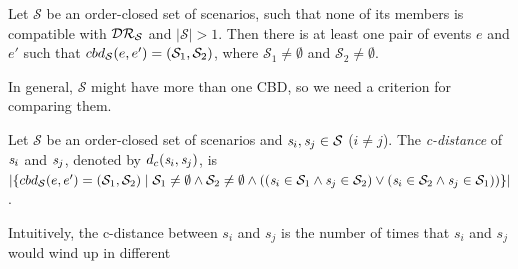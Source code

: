 \begin{theorem}
\label{thm-not-locally-stable}
Let $\mathcal{S}$ be an order-closed set of scenarios, such that
none of its members is compatible with $\mathcal{DR}_{\mathcal{S}}$
and $|\mathcal{S}|>1$.
Then there is at least one pair of events $e$ and $e'$ such that
${cbd}_{\mathcal{S}}(e,e')=(\mathcal{S}_1,\mathcal{S}_2)$, where
$\mathcal{S}_1\neq\emptyset$ and $\mathcal{S}_2\neq\emptyset$.
\end{theorem}
\noindent
In general, $\mathcal{S}$
might have more than one
CBD, so we need a criterion for comparing them.
\begin{definition}
  \label{def-c-distance}
  Let $\mathcal{S}$ be an order-closed set of scenarios and
  $\mathit{s}_i,\mathit{s}_j\in\mathcal{S}$ ($i\neq j$).
  The \emph{c-distance} of $\mathit{s}_i$ and $\mathit{s}_j$,
   denoted by ${{d}_c}(\mathit{s}_i,\mathit{s}_j)$, is
$|\{{cbd}_{\mathcal{S}}(e,e')=(\mathcal{S}_1,\mathcal{S}_2)\;|\;\mathcal{S}_1\neq\emptyset\wedge\mathcal{S}_2\neq\emptyset\wedge
      ((\mathit{s}_i\in\mathcal{S}_1\wedge\mathit{s}_j\in\mathcal{S}_2)\vee
 (\mathit{s}_i\in\mathcal{S}_2\wedge\mathit{s}_j\in\mathcal{S}_1))\}|$.
\end{definition}
\noindent
Intuitively, the c-distance between $s_i$ and $s_j$ is the
number of times that $s_i$ and $s_j$ would wind up in different
